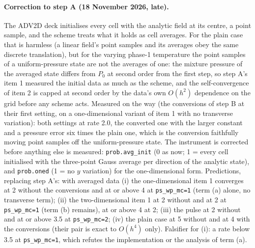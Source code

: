 \documentclass[11pt,a4paper]{article}
\newcommand{\code}[1]{\texttt{\small #1}}
\begin{document}
\paragraph{Correction to step A (18 November 2026, late).}  The ADV2D
deck initialises every cell with the analytic field at its centre, a
point sample, and the scheme treats what it holds as cell averages.  For
the plain case that is harmless (a linear field's point samples and its
averages obey the same discrete translation), but for the varying
phase-1 temperature the point samples of a uniform-pressure state are
not the averages of one: the mixture pressure of the averaged state
differs from $P_0$ at second order from the first step, so step A's
item 1 measured the initial data as much as the scheme, and the
self-convergence of item 2 is capped at second order by the data's own
$O(h^2)$ dependence on the grid before any scheme acts.  Measured on
the way (the conversions of step B at their first setting, on a
one-dimensional variant of item 1 with no transverse variation): both
settings at rate 2.0, the converted one with the larger constant and a
pressure error six times the plain one, which is the conversion
faithfully moving point samples off the uniform-pressure state.  The
instrument is corrected before anything else is measured:
\code{prob.avg\_init} (0 as now; 1 = every cell initialised with the
three-point Gauss average per direction of the analytic state), and
\code{prob.oned} (1 = no $y$ variation) for the one-dimensional form.
Predictions, replacing step A's: with averaged data (i) the
one-dimensional item 1 converges at 2 without the conversions and at or
above 4 at \code{ps\_wp\_mc=1} (term (a) alone, no transverse term);
(ii) the two-dimensional item 1 at 2 without and at 2 at
\code{ps\_wp\_mc=1} (term (b) remains), at or above 4 at 2; (iii) the
pulse at 2 without and at or above 3.5 at \code{ps\_wp\_mc=2}; (iv) the
plain case at 5 without and at 4 with the conversions (their pair is
exact to $O(h^4)$ only).  Falsifier for (i): a rate below 3.5 at
\code{ps\_wp\_mc=1}, which refutes the implementation or the analysis
of term (a).
\end{document}
